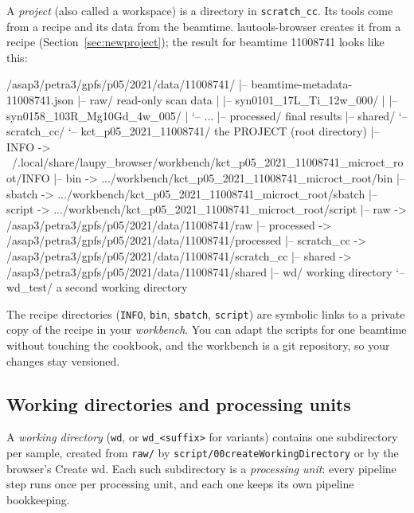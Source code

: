 \documentclass[11pt,a4paper]{article}
\newcommand{\cmd}[1]{\texttt{#1}}
\newcommand{\menu}[1]{\textsf{#1}}
\begin{document}
A \emph{project} (also called a workspace) is a directory in \cmd{scratch\_cc}. Its tools come
from a recipe and its data from the beamtime. lautools-browser creates it from a recipe
(Section~\ref{sec:newproject}); the result for beamtime 11008741 looks like this:

\begin{terminaltiny}
/asap3/petra3/gpfs/p05/2021/data/11008741/
|-- beamtime-metadata-11008741.json
|-- raw/                                    read-only scan data
|   |-- syn0101_17L_Ti_12w_000/
|   |-- syn0158_103R_Mg10Gd_4w_005/
|   `-- ...
|-- processed/                              final results
|-- shared/
`-- scratch_cc/
    `-- kct_p05_2021_11008741/              the PROJECT (root directory)
        |-- INFO     -> ~/.local/share/laupy_browser/workbench/kct_p05_2021_11008741_microct_root/INFO
        |-- bin      -> .../workbench/kct_p05_2021_11008741_microct_root/bin
        |-- sbatch   -> .../workbench/kct_p05_2021_11008741_microct_root/sbatch
        |-- script   -> .../workbench/kct_p05_2021_11008741_microct_root/script
        |-- raw        -> /asap3/petra3/gpfs/p05/2021/data/11008741/raw
        |-- processed  -> /asap3/petra3/gpfs/p05/2021/data/11008741/processed
        |-- scratch_cc -> /asap3/petra3/gpfs/p05/2021/data/11008741/scratch_cc
        |-- shared     -> /asap3/petra3/gpfs/p05/2021/data/11008741/shared
        |-- wd/                             working directory
        `-- wd_test/                        a second working directory
\end{terminaltiny}

The recipe directories (\cmd{INFO}, \cmd{bin}, \cmd{sbatch}, \cmd{script}) are symbolic links to
a private copy of the recipe in your \emph{workbench}. You can adapt the scripts for one beamtime
without touching the cookbook, and the workbench is a git repository, so your changes stay
versioned.

\subsection{Working directories and processing units}

A \emph{working directory} (\cmd{wd}, or \cmd{wd\_<suffix>} for variants) contains one
subdirectory per sample, created from \cmd{raw/} by \cmd{script/00createWorkingDirectory} or by
the browser's \menu{Create wd}. Each such subdirectory is a \emph{processing unit}: every
pipeline step runs once per processing unit, and each one keeps its own pipeline bookkeeping.
\end{document}
